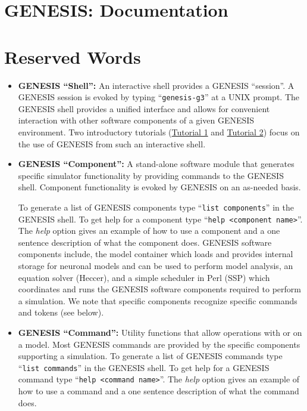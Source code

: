 \documentclass[12pt]{article}
\begin{document}
\section*{GENESIS: Documentation}

\section*{Reserved Words}

\begin{itemize}

\item {\bf GENESIS ``Shell'':} An interactive shell provides a GENESIS ``session''. A GENESIS session is evoked by typing ``{\tt genesis-g3}'' at a UNIX prompt. The GENESIS shell provides a unified interface and allows for convenient interaction with other software components of a given GENESIS environment.  Two introductory tutorials (\href{../tutorial1/tutorial1.pdf}{Tutorial 1} and \href{../tutorial2/tutorial2.pdf}{Tutorial 2}) focus on the use of GENESIS from such an interactive shell.

\item {\bf GENESIS ``Component'':}  A stand-alone software module that generates specific simulator functionality by providing commands to the GENESIS shell. Component functionality is evoked by GENESIS on an as-needed basis.

To generate a list of GENESIS components type ``{\tt list components}'' in the GENESIS shell. To get help for a component type ``{\tt help <component name>}''. The {\it help} option gives an example of how to use a component and a one sentence description of what the component does. GENESIS software components include, the model container which loads and provides internal storage for neuronal models and can be used to perform model analysis, an equation solver (Heccer), and a simple scheduler in Perl (SSP) which coordinates and runs the GENESIS software components required to perform a simulation. We note that specific components recognize specific commands and tokens (see below).

\item {\bf GENESIS ``Command'':} Utility functions that allow operations with or on a model. Most GENESIS commands are provided by the specific components supporting a simulation. To generate a list of GENESIS commands type ``{\tt list commands}'' in the GENESIS shell. To get help for a GENESIS command type ``{\tt help <command name>}''. The {\it help} option gives an example of how to use a command and a one sentence description of what the command does.


\end{itemize}
\end{document}
